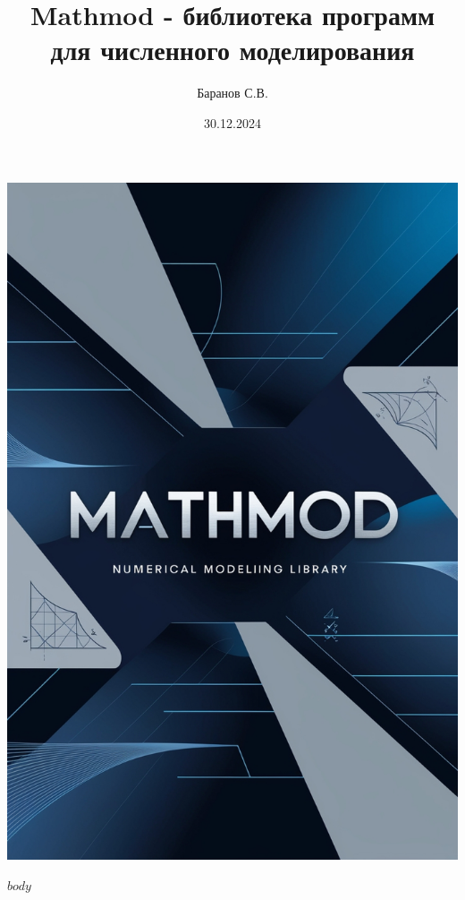 \documentclass{article}
\title{Mathmod - библиотека программ для численного моделирования}
\author{Баранов С.В.}
\date{30.12.2024}
\begin{document}
\begin{titlepage}
\centering
\vspace*{1cm}
\includegraphics[width=\textwidth]{images/Leonardo_Phoenix_Create_a_visually_striking_cover_for_Mathmod_1.jpg}
\vfill
\end{titlepage}

\maketitle

$body$
\end{document}
